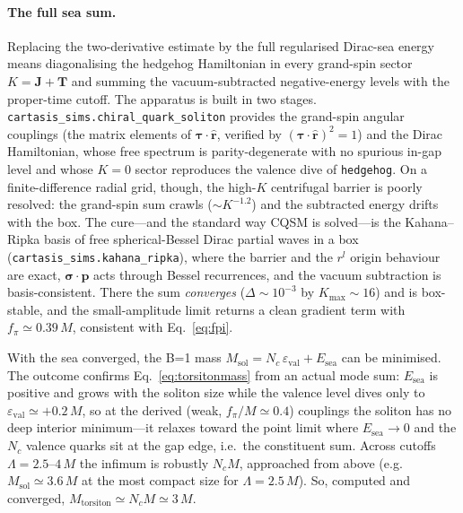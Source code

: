 \paragraph{The full sea sum.} Replacing the two-derivative estimate by the full regularised Dirac-sea
energy means diagonalising the hedgehog Hamiltonian in every grand-spin sector $K=\mathbf J+\mathbf T$
and summing the vacuum-subtracted negative-energy levels with the proper-time cutoff. The apparatus is
built in two stages. \texttt{cartasis\_sims.chiral\_quark\_soliton} provides the grand-spin angular
couplings (the matrix elements of $\boldsymbol\tau\!\cdot\!\hat{\mathbf r}$, verified by $(\boldsymbol
\tau\!\cdot\!\hat{\mathbf r})^2=1$) and the Dirac Hamiltonian, whose free spectrum is parity-degenerate
with no spurious in-gap level and whose $K{=}0$ sector reproduces the valence dive of
\texttt{hedgehog}. On a finite-difference radial grid, though, the high-$K$ centrifugal barrier is
poorly resolved: the grand-spin sum crawls ($\sim K^{-1.2}$) and the subtracted energy drifts with the
box. The cure---and the standard way CQSM is solved---is the Kahana--Ripka basis of free
spherical-Bessel Dirac partial waves in a box (\texttt{cartasis\_sims.kahana\_ripka}), where the
barrier and the $r^l$ origin behaviour are exact, $\boldsymbol\sigma\!\cdot\!\mathbf p$ acts through
Bessel recurrences, and the vacuum subtraction is basis-consistent. There the sum \emph{converges}
($\Delta\!\sim\!10^{-3}$ by $K_{\max}\!\sim\!16$) and is box-stable, and the small-amplitude limit
returns a clean gradient term with $f_\pi\simeq0.39\,M$, consistent with Eq.~\eqref{eq:fpi}.

With the sea converged, the B=1 mass $M_\mathrm{sol}=N_c\,\varepsilon_\mathrm{val}+E_\mathrm{sea}$ can be
minimised. The outcome confirms Eq.~\eqref{eq:torsitonmass} from an actual mode sum: $E_\mathrm{sea}$ is
positive and grows with the soliton size while the valence level dives only to $\varepsilon_\mathrm{val}
\simeq+0.2\,M$, so at the derived (weak, $f_\pi/M\simeq0.4$) couplings the soliton has no deep interior
minimum---it relaxes toward the point limit where $E_\mathrm{sea}\to0$ and the $N_c$ valence quarks sit
at the gap edge, i.e.\ the constituent sum. Across cutoffs $\Lambda=2.5\text{--}4\,M$ the infimum is
robustly $N_cM$, approached from above (e.g.\ $M_\mathrm{sol}\simeq3.6\,M$ at the most compact size for
$\Lambda=2.5\,M$). So, computed and converged, $M_\mathrm{torsiton}\simeq N_cM\simeq3\,M$.

